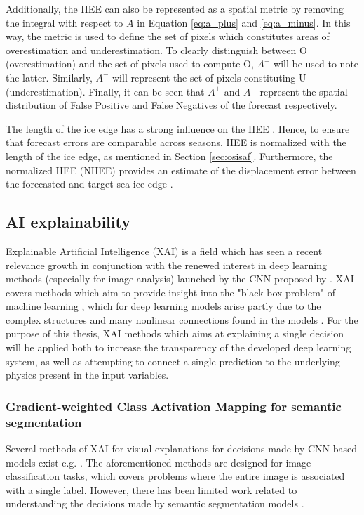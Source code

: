 \documentclass[../main/thesis.tex]{subfiles}
\begin{document}
Additionally, the IIEE can also be represented as a spatial metric by removing the integral with respect to $A$ in Equation \ref{eq:a_plus} and \ref{eq:a_minus}. In this way, the metric is used to define the set of pixels which constitutes areas of overestimation and underestimation. To clearly distinguish between O (overestimation) and the set of pixels used to compute O, $A^+$ will be used to note the latter. Similarly, $A^-$ will represent the set of pixels constituting U (underestimation). Finally, it can be seen that $A^+$ and $A^-$ represent the spatial distribution of False Positive and False Negatives of the forecast respectively.

The length of the ice edge has a strong influence on the IIEE \citep{Goessling2018,Palerme2019}. Hence, to ensure that forecast errors are comparable across seasons, IIEE is normalized with the length of the ice edge, as mentioned in Section \ref{sec:osisaf}. Furthermore, the normalized IIEE (NIIEE) provides an estimate of the displacement error between the forecasted and target sea ice edge \citep{Melsom2019}.

\subsection{AI explainability}
Explainable Artificial Intelligence (XAI) is a field which has seen a recent relevance growth in conjunction with the renewed interest in deep learning methods (especially for image analysis) launched by the CNN proposed by \citet{Krizhevsky2012}. XAI covers methods which aim to provide insight into the "black-box problem" of machine learning \citep{Adadi2018}, which for deep learning models arise partly due to the complex structures and many nonlinear connections found in the models \citep{Lopes2022}. For the purpose of this thesis, XAI methods which aims at explaining a single decision will be applied both to increase the transparency of the developed deep learning system, as well as attempting to connect a single prediction to the underlying physics present in the input variables.

\subsubsection{Gradient-weighted Class Activation Mapping for semantic segmentation}
\label{sec:seg-grad-cam}
Several methods of XAI for visual explanations for decisions made by CNN-based models exist e.g. \citep{Simonyan2013,Zhou2016,Selvaraju2016,Sundararajan2017,Lundberg2017}. The aforementioned methods are designed for image classification tasks, which covers problems where the entire image is associated with a single label. However, there has been limited work related to understanding the decisions made by semantic segmentation models \citep{Linardatos2020}.
\end{document}
